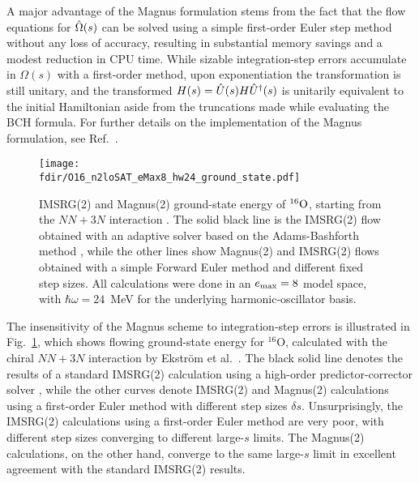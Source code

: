 A major advantage of the Magnus formulation stems from the fact that the 
flow equations for $\OmegaO(s)$ can be solved using a simple first-order 
Euler step method without any loss of accuracy, resulting in substantial 
memory savings and a modest reduction in CPU time.  While sizable 
integration-step errors accumulate in $\Omega(s)$ with a first-order method, 
upon exponentiation the transformation is still unitary, and the transformed 
$H(s)=\UO(s)H\UUO(s)$ is unitarily equivalent to the initial Hamiltonian aside 
from the truncations made while evaluating the BCH formula. For further details 
on the implementation of the Magnus formulation, see Ref.~\cite{Morris:2015ve}.

\begin{figure}[t]
  \begin{center}
    \texttt{[image: \\fdir/O16\_n2loSAT\_eMax8\_hw24\_ground\_state.pdf]}
  \end{center}
  \caption{\label{fig:timestep_O16}
    IMSRG(2) and Magnus(2) ground-state energy of $\nuc{O}{16}$, 
    starting from the \NNLOsat{} $NN+3N$ interaction \cite{Ekstrom:2015fk}. The 
    solid black line is the IMSRG(2) flow obtained with
    an adaptive solver based on the Adams-Bashforth method \cite{Radhakrishnan:1993fk}, 
    while the other lines show Magnus(2) and IMSRG(2) flows 
    obtained with a simple Forward Euler method and different 
    fixed step sizes. All calculations were done in an
    $\eMax=8$ model space, with $\hbar\omega = 24$~MeV for the
    underlying harmonic-oscillator basis.}
\end{figure}

The insensitivity of the Magnus scheme to integration-step errors is illustrated 
in Fig.~\ref{fig:timestep_O16}, which shows flowing ground-state energy for 
$^{16}$O, calculated with the chiral \NNLOsat{} $NN+3N$ 
interaction by Ekstr\"{o}m et al.~\cite{Ekstrom:2015fk}. The black solid line 
denotes the results of a standard IMSRG(2) calculation using a high-order 
predictor-corrector solver \cite{Hindmarsh:1983pd,Hindmarsh:2005kl}, while the 
other curves denote IMSRG(2) and Magnus(2) calculations using a first-order Euler 
method with different step sizes $\delta s$. Unsurprisingly, the IMSRG(2) calculations 
using a first-order Euler method are very poor, with different step sizes
converging to different large-$s$ limits. The Magnus(2) calculations,
on the other hand, converge to the same large-$s$ limit in excellent
agreement with the standard IMSRG(2) results.

